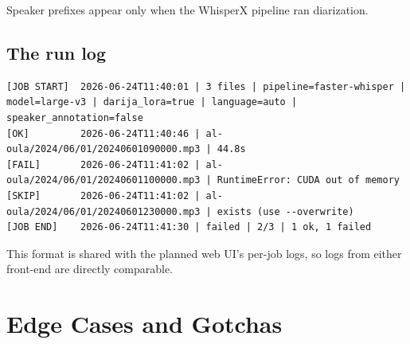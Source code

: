 \documentclass[11pt,a4paper]{report}
\begin{document}
Speaker prefixes appear only when the WhisperX pipeline ran diarization.

\section{The run log}

\begin{lstlisting}[style=sh,numbers=none,caption={Example \texttt{out/logs/cli-<ts>.log}.}]
[JOB START]  2026-06-24T11:40:01 | 3 files | pipeline=faster-whisper | model=large-v3 | darija_lora=true | language=auto | speaker_annotation=false
[OK]         2026-06-24T11:40:46 | al-oula/2024/06/01/20240601090000.mp3 | 44.8s
[FAIL]       2026-06-24T11:41:02 | al-oula/2024/06/01/20240601100000.mp3 | RuntimeError: CUDA out of memory
[SKIP]       2026-06-24T11:41:02 | al-oula/2024/06/01/20240601230000.mp3 | exists (use --overwrite)
[JOB END]    2026-06-24T11:41:30 | failed | 2/3 | 1 ok, 1 failed
\end{lstlisting}

This format is shared with the planned web UI's per-job logs, so logs from either
front-end are directly comparable.

\chapter{Edge Cases and Gotchas}
\label{ch:edge}
\end{document}
